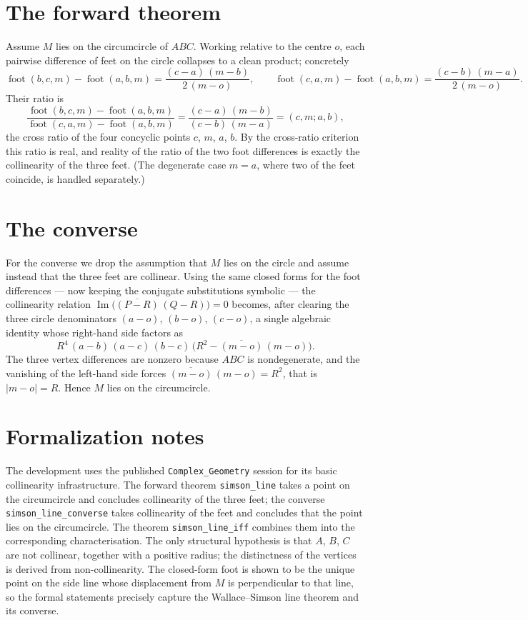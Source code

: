 \documentclass[11pt,a4paper]{article}
\begin{document}
\section{The forward theorem}

Assume \(M\) lies on the circumcircle of \(ABC\).  Working relative to the
centre \(o\), each pairwise difference of feet on the circle collapses to a
clean product; concretely
\[
  \operatorname{foot}(b,c,m) - \operatorname{foot}(a,b,m)
    = \frac{(c-a)\,(m-b)}{2\,(m-o)},
  \qquad
  \operatorname{foot}(c,a,m) - \operatorname{foot}(a,b,m)
    = \frac{(c-b)\,(m-a)}{2\,(m-o)}.
\]
Their ratio is
\[
  \frac{\operatorname{foot}(b,c,m) - \operatorname{foot}(a,b,m)}
       {\operatorname{foot}(c,a,m) - \operatorname{foot}(a,b,m)}
    = \frac{(c-a)\,(m-b)}{(c-b)\,(m-a)}
    = (c,m;a,b),
\]
the cross ratio of the four concyclic points \(c\), \(m\), \(a\), \(b\).  By the
cross-ratio criterion this ratio is real, and reality of the ratio of the two
foot differences is exactly the collinearity of the three feet.  (The
degenerate case \(m=a\), where two of the feet coincide, is handled separately.)

\section{The converse}

For the converse we drop the assumption that \(M\) lies on the circle and assume
instead that the three feet are collinear.  Using the same closed forms for the
foot differences --- now keeping the conjugate substitutions symbolic --- the
collinearity relation \(\operatorname{Im}\bigl(\overline{(P-R)}\,(Q-R)\bigr)=0\)
becomes, after clearing the three circle denominators \((a-o)\), \((b-o)\),
\((c-o)\), a single algebraic identity whose right-hand side factors as
\[
  R^{4}\,(a-b)\,(a-c)\,(b-c)\,\bigl(R^{2} - \overline{(m-o)}\,(m-o)\bigr).
\]
The three vertex differences are nonzero because \(ABC\) is nondegenerate, and
the vanishing of the left-hand side forces \(\overline{(m-o)}\,(m-o) = R^{2}\),
that is \(\lvert m-o\rvert = R\).  Hence \(M\) lies on the circumcircle.

\section{Formalization notes}

The development uses the published \texttt{Complex\_Geometry} session for its
basic collinearity infrastructure.  The forward
theorem \texttt{simson\_line} takes a point on the circumcircle and concludes
collinearity of the three feet; the converse
\texttt{simson\_line\_converse} takes collinearity of the feet and concludes
that the point lies on the circumcircle.  The theorem
\texttt{simson\_line\_iff} combines them into the corresponding
characterisation.  The only structural hypothesis is that \(A\), \(B\), \(C\)
are not collinear, together with a positive radius; the distinctness of the
vertices is derived from non-collinearity.  The closed-form foot is shown to be
the unique point on the side line whose displacement from \(M\) is
perpendicular to that line, so the formal statements precisely capture the
Wallace--Simson line theorem and its converse.





\end{document}
